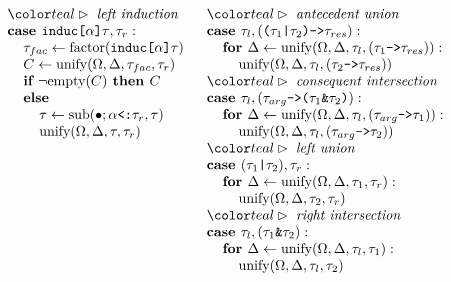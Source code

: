 \documentclass[acmsmall]{acmart}
\begin{document}
\begin{figure*}[h]
\[\begin{array}[t]{@{} l}
    \I \C{left induction}
    \\
    \I \B{case } \code{induc[$\alpha$]$\tau$}, \tau_r :
    \\
    \I\I \tau_{fac} \leftarrow \F{factor}(\code{induc[$\alpha$]$\tau$})
    \\
    \I\I C \leftarrow \F{unify}(\Omega, \Delta, \tau_{fac}, \tau_r)
    \\
    \I\I \B{if } \neg \F{empty}(C) \B{ then } C
    \\
    \I\I \B{else }
    \\
    \I\I\I \tau \leftarrow \F{sub}(\bullet;\code{$\alpha$<:$\tau_r$}, \tau) 
    \\
    \I\I\I \F{unify}(\Omega, \Delta, \tau, \tau_r)
\end{array}
\begin{array}[t]{@{} l}

    \I \C{antecedent union}
    \\
    \I \B{case } \tau_l, (\code{($\tau_1$|$\tau_2$)->$\tau_{res}$}) : 
    \\
    \I\I \B{for } \Delta \leftarrow \F{unify}(\Omega, \Delta, \tau_l, (\code{$\tau_1$->$\tau_{res}$})):
    \\
    \I\I\I \F{unify}(\Omega, \Delta, \tau_l, (\code{$\tau_2$->$\tau_{res}$})) 

    \\

    \I \C{consequent intersection}
    \\
    \I \B{case } \tau_l, (\code{$\tau_{arg}$->($\tau_1$\&$\tau_2$)}) : 
    \\
    \I\I \B{for } \Delta \leftarrow \F{unify}(\Omega, \Delta, \tau_l, (\code{$\tau_{arg}$->$\tau_1$})):
    \\
    \I\I\I \F{unify}(\Omega, \Delta, \tau_l, (\code{$\tau_{arg}$->$\tau_2$}))

    \\

    \I \C{left union}
    \\
    \I \B{case } (\code{$\tau_1$|$\tau_2$}), \tau_r : 
    \\
    \I\I \B{for } \Delta \leftarrow \F{unify}(\Omega, \Delta, \tau_1, \tau_r):
    \\
    \I\I\I \F{unify}(\Omega, \Delta, \tau_2, \tau_r) 

    \\

    \I \C{right intersection}
    \\
    \I \B{case } \tau_l, (\code{$\tau_1$\&$\tau_2$}) : 
    \\
    \I\I \B{for } \Delta \leftarrow \F{unify}(\Omega, \Delta, \tau_l, \tau_1):
    \\
    \I\I\I \F{unify}(\Omega, \Delta, \tau_l, \tau_2) 


\end{array}\]
\end{figure*}
\end{document}
